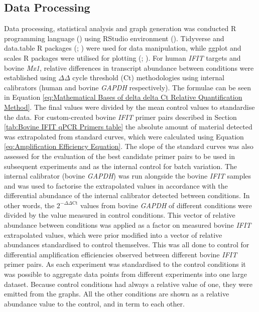 \subsection{Data Processing} \label{subsec:Data Processing}
Data processing, statistical analysis and graph generation was conducted R programming language (\cite{RCoreTeam2022R:Computing}) using RStudio environment (\cite{RStudioTeam2022RStudio:RStudio}). Tidyverse and data.table R packages (\cite{Wickham2019WelcomeTidyverse}; \cite{Dowle2022Data.table:data.frame}) were used for data manipulation, while ggplot and scales R packages were utilised for plotting (\cite{Wickham2019WelcomeTidyverse}; \cite{Wickham2022Scales:Visualization}). For human \textit{IFIT} targets and bovine \textit{Mx1}, relative differences in transcript abundance between conditions were established using \(\Delta\)\(\Delta\) cycle threshold (Ct) methodologies using internal calibrators (human and bovine \textit{GAPDH} respectively). The formulae can be seen in Equation \ref{eq:Mathematical Bases of delta delta Ct Relative Quantification Method}. The final values were divided by the mean control values to standardise the data. For custom-created bovine \textit{IFIT} primer pairs described in Section \ref{tab:Bovine IFIT qPCR Primers table} the absolute amount of material detected was extrapolated from standard curves, which were calculated using Equation \ref{eq:Amplification Efficiency Equation}. The slope of the standard curves was also assessed for the evaluation of the best candidate primer pairs to be used in subsequent experiments and as the internal control for batch variation. The internal calibrator (bovine \textit{GAPDH}) was run alongside the bovine \textit{IFIT} samples and was used to factorise the extrapolated values in accordance with the differential abundance of the internal calibrator detected between conditions. In other words, the \(2^{-\Delta\Delta \mbox{Ct}}\) values from bovine \textit{GAPDH} of different conditions were divided by the value measured in control conditions. This vector of relative abundance between conditions was applied as a factor on measured bovine \textit{IFIT} extrapolated values, which were prior modified into a vector of relative abundances standardised to control themselves. This was all done to control for differential amplification efficiencies observed between different bovine \textit{IFIT} primer pairs. As each experiment was standardised to the control conditions it was possible to aggregate data points from different experiments into one large dataset. Because control conditions had always a relative value of one, they were emitted from the graphs. All the other conditions are shown as a relative abundance value to the control, and in term to each other. 


